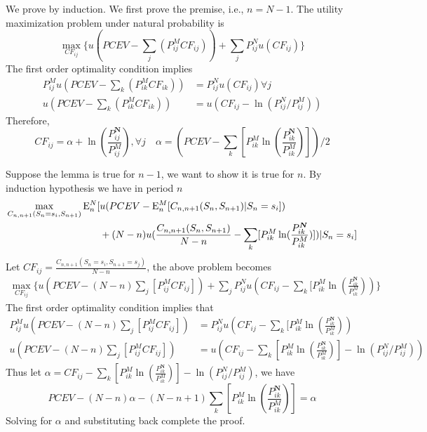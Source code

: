 \proof We prove by induction. We first prove the premise, i.e., $n = N-1$. The utility maximization problem under natural probability  is
\[ \max_{CF_{ij}} \{ u(PCEV- \sum_{j}(P_{ij}^MCF_{ij})) +\sum_{j}P^N_{ij}u(CF_{ij}) \}\]
The first order optimality condition implies
\begin{align*}
P_{ij}^Mu(PCEV- \sum_{k}(P_{ik}^M CF_{ik})) &= P_{ij}^N u(CF_{ij}) \forall j\\
u( PCEV- \sum_{k}(P_{ik}^M CF_{ik})) & = u(CF_{ij} - \ln(P_{ij}^N/P_{ij}^M)) 
\end{align*}
Therefore,
\[CF_{ij} =  \alpha + \ln(\frac{P_{ij}^{\bm{N}}}{P_{ij}^M}) , \forall j \quad \alpha = (PCEV - \sum_{k}[P_{ik}^M\ln(\frac{P_{ik}^{\bm{N}}}{P_{ik}^M})])/2 \]

Suppose the lemma is true for $n-1$, we want to show it is true for $n$. By induction hypothesis we have in period $n$
\begin{align*}
\max_{C_{n,n+1}(S_n=s_i,S_{n+1})} \mathrm{E}_{n}^N[ &u (PCEV - \mathrm{E}_{n}^M[C_{n,n+1}(S_{n},S_{n+1})|S_{n}=s_i]) \\& + (N-n) u(\frac{C_{n,n+1}(S_n,S_{n+1})}{N-n}-\sum_{k}[P_{ik}^M\ln(\frac{P_{ik}^{\bm{N}}}{P_{ik}^M})])|S_n=s_i]
\end{align*}
Let $CF_{ij} =\frac{C_{n,n+1}(S_n=s_i,S_{n+1}=s_j)}{N-n}$, the above problem becomes
\begin{align*}
\max_{CF_{ij}} \{u(PCEV-(N-n)\sum_{j} [P_{ij}^M CF_{ij}]) + \sum_{j} P_{ij}^Nu(CF_{ij}-\sum_{k}[P_{ik}^M\ln(\frac{P_{ik}^{\bm{N}}}{P_{ik}^M})) \}
\end{align*}
The first order optimality condition implies that
\begin{align*}
P_{ij}^M u(PCEV-(N-n)\sum_{j} [P_{ij}^M CF_{ij}])&= P_{ij}^Nu(CF_{ij} -\sum_{k}[P_{ik}^M\ln(\frac{P_{ik}^{\bm{N}}}{P_{ik}^M})) \\
u(PCEV-(N-n)\sum_{j} [P_{ij}^M CF_{ij}]) &= u(CF_{ij} - \sum_{k}[P_{ik}^M\ln(\frac{P_{ik}^{\bm{N}}}{P_{ik}^M})]-\ln (P_{ij}^N/P_{ij}^M) )
\end{align*}
Thus let $\alpha = CF_{ij} - \sum_{k}[P_{ik}^M\ln(\frac{P_{ik}^{\bm{N}}}{P_{ik}^M})]-\ln (P_{ij}^N/P_{ij}^M)$, we have
\[ PCEV - (N-n) \alpha - (N-n+1)\sum_{k}[P_{ik}^M\ln(\frac{P_{ik}^{\bm{N}}}{P_{ik}^M})]  = \alpha\]
Solving for $\alpha$ and substituting back complete the proof.
\endproof








